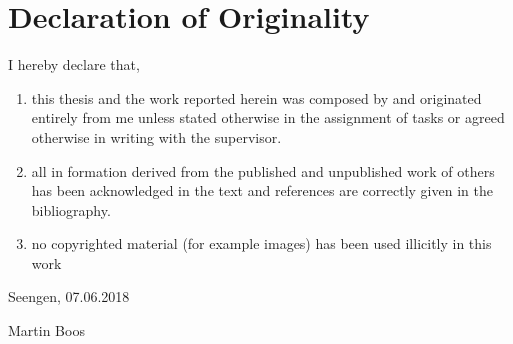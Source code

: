 \cleardoublepage
\markleft{\abstractname}

\chapter*{Declaration of Originality}
I hereby declare that,

\begin{enumerate}
    \item this thesis and the work reported herein was composed by and originated entirely from me unless
stated otherwise in the assignment of tasks or agreed otherwise in writing with the supervisor.
    \item all in formation derived from the published and unpublished work of others has been acknowledged
in the text and references are correctly given in the bibliography.
    \item no copyrighted material (for example images) has been used illicitly in this work
\end{enumerate}

\begin{flushright}
Seengen, 07.06.2018

Martin Boos
\end{flushright}